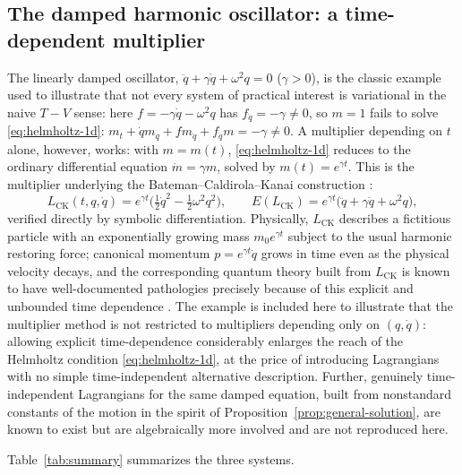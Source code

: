 \documentclass[11pt]{article}
\theoremstyle{remark}
\begin{document}
\subsection{The damped harmonic oscillator: a time-dependent multiplier}

The linearly damped oscillator, $\ddot q+\gamma\dot q+\omega^2 q=0$ ($\gamma>0$), is the classic example used to illustrate that not every system of practical interest is variational in the naive $T-V$ sense: here $f=-\gamma\dot q-\omega^2 q$ has $f_{\dot q}=-\gamma\neq 0$, so $m=1$ fails to solve \eqref{eq:helmholtz-1d}: $m_t+\dot q m_q+fm_{\dot q}+f_{\dot q}m = -\gamma\neq 0$. A multiplier depending on $t$ alone, however, works: with $m=m(t)$, \eqref{eq:helmholtz-1d} reduces to the ordinary differential equation $\dot m = \gamma m$, solved by $m(t)=e^{\gamma t}$. This is the multiplier underlying the Bateman--Caldirola--Kanai construction \cite{Bateman1931,Caldirola1941,Kanai1948}:
\begin{equation}
L_{\mathrm{CK}}(t,q,\dot q) = e^{\gamma t}\Big(\tfrac12\dot q^2-\tfrac12\omega^2 q^2\Big), \qquad E(L_{\mathrm{CK}}) = e^{\gamma t}\big(\ddot q+\gamma\dot q+\omega^2 q\big),
\label{eq:LCK}
\end{equation}
verified directly by symbolic differentiation. Physically, $L_{\mathrm{CK}}$ describes a fictitious particle with an exponentially growing mass $m_0 e^{\gamma t}$ subject to the usual harmonic restoring force; canonical momentum $p=e^{\gamma t}\dot q$ grows in time even as the physical velocity decays, and the corresponding quantum theory built from $L_{\mathrm{CK}}$ is known to have well-documented pathologies precisely because of this explicit and unbounded time dependence \cite{Bagarello2019}. The example is included here to illustrate that the multiplier method is not restricted to multipliers depending only on $(q,\dot q)$: allowing explicit time-dependence considerably enlarges the reach of the Helmholtz condition \eqref{eq:helmholtz-1d}, at the price of introducing Lagrangians with no simple time-independent alternative description. Further, genuinely time-independent Lagrangians for the same damped equation, built from nonstandard constants of the motion in the spirit of Proposition~\ref{prop:general-solution}, are known to exist \cite{Kobussen1979,Leubner1981} but are algebraically more involved and are not reproduced here.

Table~\ref{tab:summary} summarizes the three systems.
\end{document}
